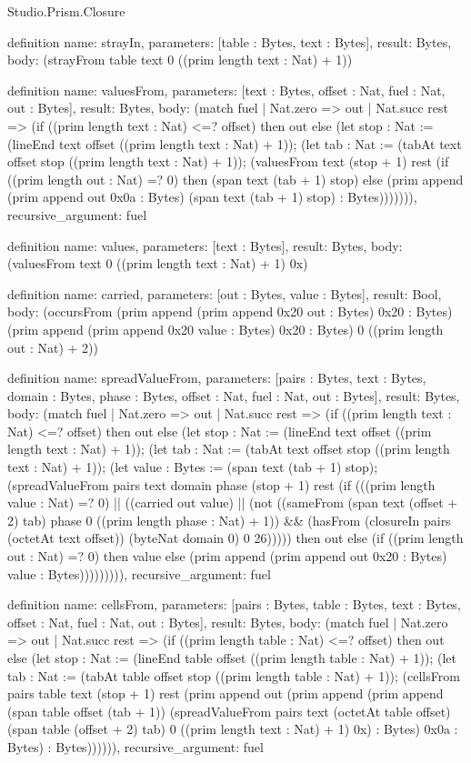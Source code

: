 \begin{lexlean}{Studio.Prism.Closure}
\begin{semanticmodule}
definition{
  name: strayIn,
  parameters: [table : Bytes, text : Bytes],
  result: Bytes,
  body: (strayFrom table text 0 ((prim length text : Nat) + 1))
}

definition{
  name: valuesFrom,
  parameters: [text : Bytes, offset : Nat, fuel : Nat, out : Bytes],
  result: Bytes,
  body: (match fuel
    | Nat.zero => out
    | Nat.succ rest => (if ((prim length text : Nat) <=? offset) then out else (let stop : Nat := (lineEnd text offset ((prim length text : Nat) + 1)); (let tab : Nat := (tabAt text offset stop ((prim length text : Nat) + 1)); (valuesFrom text (stop + 1) rest (if ((prim length out : Nat) =? 0) then (span text (tab + 1) stop) else (prim append (prim append out 0x0a : Bytes) (span text (tab + 1) stop) : Bytes))))))),
  recursive_argument: fuel
}

definition{
  name: values,
  parameters: [text : Bytes],
  result: Bytes,
  body: (valuesFrom text 0 ((prim length text : Nat) + 1) 0x)
}

definition{
  name: carried,
  parameters: [out : Bytes, value : Bytes],
  result: Bool,
  body: (occursFrom (prim append (prim append 0x20 out : Bytes) 0x20 : Bytes) (prim append (prim append 0x20 value : Bytes) 0x20 : Bytes) 0 ((prim length out : Nat) + 2))
}

definition{
  name: spreadValueFrom,
  parameters: [pairs : Bytes, text : Bytes, domain : Bytes, phase : Bytes, offset : Nat, fuel : Nat, out : Bytes],
  result: Bytes,
  body: (match fuel
    | Nat.zero => out
    | Nat.succ rest => (if ((prim length text : Nat) <=? offset) then out else (let stop : Nat := (lineEnd text offset ((prim length text : Nat) + 1)); (let tab : Nat := (tabAt text offset stop ((prim length text : Nat) + 1)); (let value : Bytes := (span text (tab + 1) stop); (spreadValueFrom pairs text domain phase (stop + 1) rest (if (((prim length value : Nat) =? 0) || ((carried out value) || (not ((sameFrom (span text (offset + 2) tab) phase 0 ((prim length phase : Nat) + 1)) && (hasFrom (closureIn pairs (octetAt text offset)) (byteNat domain 0) 0 26))))) then out else (if ((prim length out : Nat) =? 0) then value else (prim append (prim append out 0x20 : Bytes) value : Bytes))))))))),
  recursive_argument: fuel
}

definition{
  name: cellsFrom,
  parameters: [pairs : Bytes, table : Bytes, text : Bytes, offset : Nat, fuel : Nat, out : Bytes],
  result: Bytes,
  body: (match fuel
    | Nat.zero => out
    | Nat.succ rest => (if ((prim length table : Nat) <=? offset) then out else (let stop : Nat := (lineEnd table offset ((prim length table : Nat) + 1)); (let tab : Nat := (tabAt table offset stop ((prim length table : Nat) + 1)); (cellsFrom pairs table text (stop + 1) rest (prim append out (prim append (prim append (span table offset (tab + 1)) (spreadValueFrom pairs text (octetAt table offset) (span table (offset + 2) tab) 0 ((prim length text : Nat) + 1) 0x) : Bytes) 0x0a : Bytes) : Bytes)))))),
  recursive_argument: fuel
}


\end{semanticmodule}
\end{lexlean}
